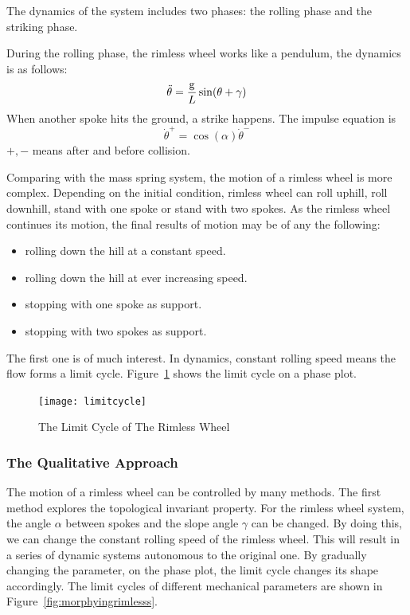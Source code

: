 The dynamics of the system includes two phases: the rolling phase and the striking phase.

During the rolling phase, the rimless wheel works like a pendulum, the dynamics is as follows:
\[
\ddot{\theta}=\frac{\mathrm{g}}{L}\sin(\theta+\gamma)
\]
When another spoke hits the ground, a strike happens. The impulse equation is
\[
\dot{\theta}^{+}=\cos(\alpha)\dot{\theta}^{-}
\] 
$+,-$ means after and before collision.

Comparing with the mass spring system, the motion of a rimless wheel is more complex. 
Depending on the initial condition, rimless wheel can roll uphill, roll downhill, stand with one spoke or stand with two spokes.
As the rimless wheel continues its motion, the final results of motion may be of any the following:
\begin{itemize}
\item rolling down the hill at a constant speed.
\item rolling down the hill at ever increasing speed.
\item stopping with one spoke as support.
\item stopping with two spokes as support.
\end{itemize}
The first one is of much interest.
In dynamics, constant rolling speed means the flow forms a limit cycle.
Figure~\ref{fig:lcofrimlesswheel} shows the limit cycle on a phase plot.
\begin{figure}[!htbp]
  \begin{center}
     \texttt{[image: limitcycle]}
    \caption{The Limit Cycle of The Rimless Wheel}
    \label{fig:lcofrimlesswheel}  
  \end{center}
\end{figure}




\subsubsection*{The Qualitative Approach}
The motion of a rimless wheel can be controlled by many methods.
The first method explores the topological invariant property.
For the rimless wheel system, the angle $\alpha$ between spokes and the slope angle $\gamma$ can be changed.
By doing this, we can change the constant rolling speed of the rimless wheel.
This will result in  a series of dynamic systems autonomous to the original one.
By gradually changing the parameter, on the phase plot, the limit cycle changes its shape accordingly.
The limit cycles of different mechanical parameters are shown in Figure~\ref{fig:morphyingrimlesss}.

